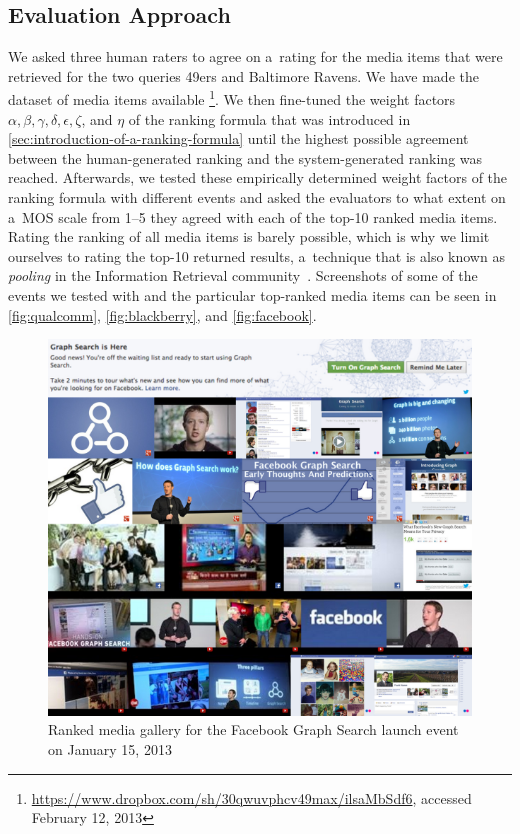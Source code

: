 \subsection{Evaluation Approach}

We asked three human raters to agree on a~rating for the media items
that were retrieved for the two queries 49ers and Baltimore Ravens.
We have made the dataset of media items available%
\footnote{\url{https://www.dropbox.com/sh/30qwuvphcv49max/ilsaMbSdf6},
accessed February 12, 2013}.
We then fine-tuned the weight factors
$ \alpha, \beta, \gamma, \delta, \epsilon, \zeta $, and $ \eta $ of the ranking formula
that was introduced in \autoref{sec:introduction-of-a-ranking-formula}
until the highest possible agreement between the human-generated ranking
and the system-generated ranking was reached.
Afterwards, we tested these empirically determined weight factors of the ranking formula
with different events and asked the evaluators to what extent
on a~MOS scale from 1--5 they agreed with each of the top-10 ranked media items.
Rating the ranking of all media items is barely possible,
which is why we limit ourselves to rating the top-10 returned results,
a~technique that is also known as \emph{pooling}
in the Information Retrieval community~\cite{liu2009learningtorank}.
Screenshots of some of the events we tested with
and the particular top-ranked media items can be seen in 
\autoref{fig:qualcomm}, \autoref{fig:blackberry}, and \autoref{fig:facebook}.

\begin{figure}[htb]
  \centering
  \includegraphics[width=0.75\linewidth]{facebook.png}
  \caption[Ranked media gallery for the Facebook Graph Search launch event]
  {Ranked media gallery for the Facebook Graph Search launch event
  on January 15, 2013}
  \label{fig:facebook}
\end{figure}

